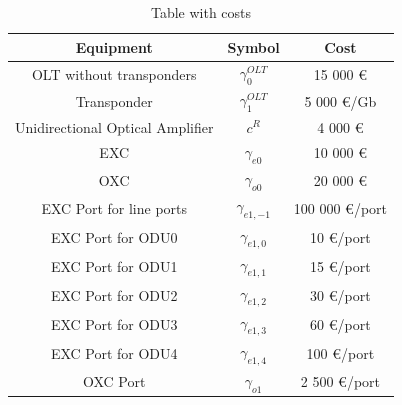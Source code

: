 \begin{table}[h!]
\centering
\begin{tabular}{|| c | c | c||}
 \hline
 Equipment & Symbol & Cost \\
 \hline\hline
 OLT without transponders & $\gamma_0^{OLT}$ & 15 000 \euro \\
 Transponder & $\gamma_1^{OLT}$ & 5 000 \euro/Gb \\
 Unidirectional Optical Amplifier & $c^R$ & 4 000 \euro \\
 EXC & $\gamma_{e0}$ & 10 000 \euro \\
 OXC & $\gamma_{o0}$ & 20 000 \euro \\
 EXC Port for line ports & $\gamma_{e1,-1}$ & 100 000 \euro /port\\
 EXC Port for ODU0 & $\gamma_{e1,0}$ & 10 \euro /port\\
 EXC Port for ODU1 & $\gamma_{e1,1}$ & 15 \euro /port\\
 EXC Port for ODU2 & $\gamma_{e1,2}$ & 30 \euro /port\\
 EXC Port for ODU3 & $\gamma_{e1,3}$ & 60 \euro /port\\
 EXC Port for ODU4 & $\gamma_{e1,4}$ & 100 \euro /port\\
 OXC Port & $\gamma_{o1}$ & 2 500 \euro /port \\
 \hline
\end{tabular}
\caption{Table with costs}
\label{table_cost_ilp}
\end{table}

